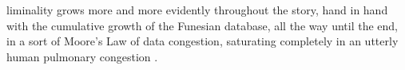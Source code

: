 liminality grows more and more evidently throughout the story, hand in hand with the cumulative growth of the Funesian database, all the way until the end, in a sort of Moore's Law of data congestion, saturating completely in an utterly human pulmonary congestion \parencite{Ovi19:Mem}.






